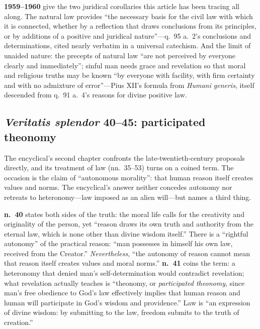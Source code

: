 \textbf{1959--1960} give the two juridical corollaries this article has been tracing all along. The natural law provides ``the necessary basis for the civil law with which it is connected, whether by a reflection that draws conclusions from its principles, or by additions of a positive and juridical nature''---q.~95 a.~2's conclusions and determinations, cited nearly verbatim in a universal catechism. And the limit of unaided nature: the precepts of natural law ``are not perceived by everyone clearly and immediately''; sinful man needs grace and revelation so that moral and religious truths may be known ``by everyone with facility, with firm certainty and with no admixture of error''---Pius XII's formula from \emph{Humani generis}, itself descended from q.~91 a.~4's reasons for divine positive law.

\subsection{\emph{Veritatis splendor} 40--45: participated theonomy}

The encyclical's second chapter confronts the late-twentieth-century proposals directly, and its treatment of law (nn.~35--53) turns on a coined term. The occasion is the claim of ``autonomous morality'': that human reason itself creates values and norms. The encyclical's answer neither concedes autonomy nor retreats to heteronomy---law imposed as an alien will---but names a third thing.

\textbf{n.~40} states both sides of the truth: the moral life calls for the creativity and originality of the person, yet ``reason draws its own truth and authority from the eternal law, which is none other than divine wisdom itself.'' There is a ``rightful autonomy'' of the practical reason: ``man possesses in himself his own law, received from the Creator.'' \emph{Nevertheless}, ``the autonomy of reason cannot mean that reason itself creates values and moral norms.'' \textbf{n.~41} coins the term: a heteronomy that denied man's self-determination would contradict revelation; what revelation actually teaches is ``theonomy, or \emph{participated theonomy}, since man's free obedience to God's law effectively implies that human reason and human will participate in God's wisdom and providence.'' Law is ``an expression of divine wisdom: by submitting to the law, freedom submits to the truth of creation.''

